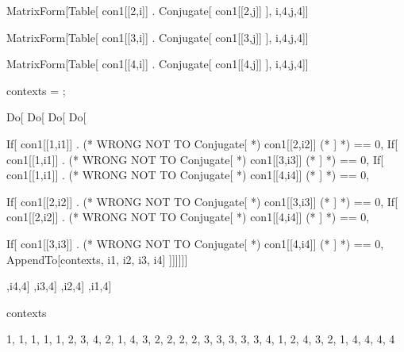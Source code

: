 MatrixForm[Table[ con1[[2,i]] . Conjugate[ con1[[2,j]] ], {i,4},{j,4}]]

MatrixForm[Table[ con1[[3,i]] . Conjugate[ con1[[3,j]] ], {i,4},{j,4}]]

MatrixForm[Table[ con1[[4,i]] . Conjugate[ con1[[4,j]] ], {i,4},{j,4}]]

contexts = {};

Do[
Do[
Do[
Do[

If[ con1[[1,i1]] .  (* WRONG NOT TO Conjugate[ *)  con1[[2,i2]] (* ] *)  == 0,
If[ con1[[1,i1]] .  (* WRONG NOT TO Conjugate[ *)  con1[[3,i3]] (* ] *)  == 0,
If[ con1[[1,i1]] .  (* WRONG NOT TO Conjugate[ *)  con1[[4,i4]] (* ] *)  == 0,

If[ con1[[2,i2]] .  (* WRONG NOT TO Conjugate[ *)  con1[[3,i3]] (* ] *)  == 0,
If[ con1[[2,i2]] .  (* WRONG NOT TO Conjugate[ *)  con1[[4,i4]] (* ] *)  == 0,

If[ con1[[3,i3]] .  (* WRONG NOT TO Conjugate[ *)  con1[[4,i4]] (* ] *)  == 0,  AppendTo[contexts, {i1, i2, i3, i4}]
]]]]]]

,{i4,4}]
,{i3,4}]
,{i2,4}]
,{i1,4}]

contexts

{{1, 1, 1, 1}, {1, 2, 3, 4}, {2, 1, 4, 3}, {2, 2, 2, 2}, {3, 3, 3, 3}, {3, 4, 1, 2}, {4, 3, 2, 1}, {4, 4, 4, 4}}
